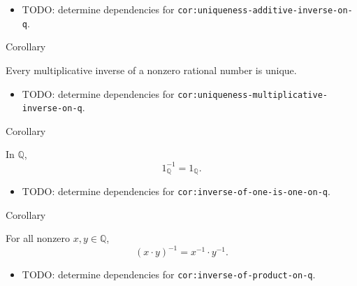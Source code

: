 \begin{dependencies}
\begin{itemize}
  \item TODO: determine dependencies for \texttt{cor:uniqueness-additive-inverse-on-q}.
\end{itemize}
\end{dependencies}

\begin{corollarybox}{Corollary}
\begin{corollary}
\label{cor:uniqueness-multiplicative-inverse-on-q}
Every multiplicative inverse of a nonzero rational number is unique.
\end{corollary}
\end{corollarybox}

\begin{dependencies}
\begin{itemize}
  \item TODO: determine dependencies for \texttt{cor:uniqueness-multiplicative-inverse-on-q}.
\end{itemize}
\end{dependencies}

\begin{corollarybox}{Corollary}
\begin{corollary}
\label{cor:inverse-of-one-is-one-on-q}
In $\mathbb{Q}$,
\[
1_{\mathbb{Q}}^{-1}=1_{\mathbb{Q}}.
\]
\end{corollary}
\end{corollarybox}

\begin{dependencies}
\begin{itemize}
  \item TODO: determine dependencies for \texttt{cor:inverse-of-one-is-one-on-q}.
\end{itemize}
\end{dependencies}

\begin{corollarybox}{Corollary}
\begin{corollary}
\label{cor:inverse-of-product-on-q}
For all nonzero $x,y\in\mathbb{Q}$,
\[
(x\cdot y)^{-1}=x^{-1}\cdot y^{-1}.
\]
\end{corollary}
\end{corollarybox}

\begin{dependencies}
\begin{itemize}
  \item TODO: determine dependencies for \texttt{cor:inverse-of-product-on-q}.
\end{itemize}
\end{dependencies}

